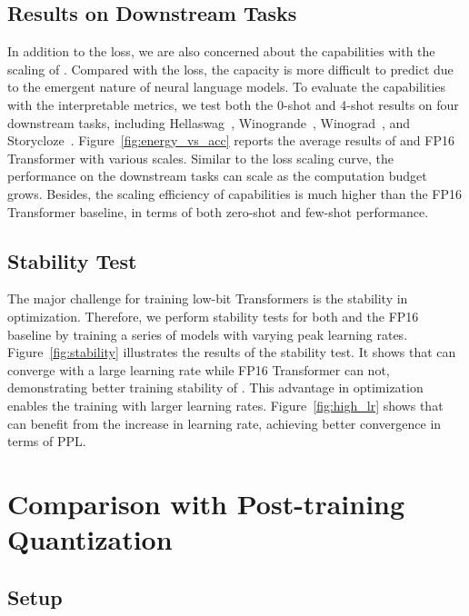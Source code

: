 \subsection{Results on Downstream Tasks}

In addition to the loss, we are also concerned about the capabilities with the scaling of \our{}. Compared with the loss, the capacity is more difficult to predict due to the emergent nature of neural language models. To evaluate the capabilities with the interpretable metrics, we test both the 0-shot and 4-shot results on four downstream tasks, including Hellaswag~\cite{hellaswag}, Winogrande~\cite{winoGrande}, Winograd~\cite{winograd}, and Storycloze~\cite{storycloze}. Figure~\ref{fig:energy_vs_acc} reports the average results of \our{} and FP16 Transformer with various scales. Similar to the loss scaling curve, the performance on the downstream tasks can scale as the computation budget grows. Besides, the scaling efficiency of capabilities is much higher than the FP16 Transformer baseline, in terms of both zero-shot and few-shot performance.

\subsection{Stability Test}

The major challenge for training low-bit Transformers is the stability in optimization. Therefore, we perform stability tests for both \our{} and the FP16 baseline by training a series of models with varying peak learning rates. Figure~\ref{fig:stability} illustrates the results of the stability test. It shows that \our{} can converge with a large learning rate while FP16 Transformer can not, demonstrating better training stability of \our{}. This advantage in optimization enables the training with larger learning rates. Figure~\ref{fig:high_lr} shows that \our{} can benefit from the increase in learning rate, achieving better convergence in terms of PPL.

\section{Comparison with Post-training Quantization}

\subsection{Setup}

